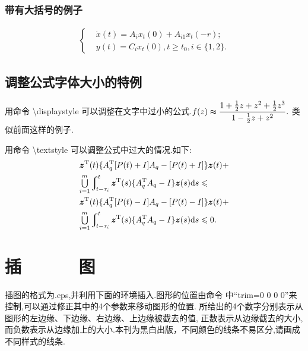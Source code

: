 \documentclass{ctacn}%
\begin{document}
\begin{multicols}{2}
\subsubsection{带有大括号的例子}\vspace{-15pt}
\begin{align}
\left\{\begin{aligned}
&\dot{x}(t)=A_{i}x_{t}(0)+A_{i1}x_{t}(-r);\\
&y(t)=C_{i}x_{t}(0),t\geqslant t_{0}, i\in\{1, 2\}.
\end{aligned}\right.
\end{align}


\subsection{调整公式字体大小的特例}

用命令 \textbackslash displaystyle  可以调整在文字中过小的公式.\;$f(z)\thickapprox{\displaystyle\frac{1+\frac{1}{2}z+z^2+\frac{1}{2}z^3}{1-\frac{1}{2}z+z^2}}.$
类似前面这样的例子.

用命令 \textbackslash textstyle 可以调整公式中过大的情况.\;如下:
\begin{align}
&{\bm z}^{\rm T}(t)\{A_q^{\rm T}[P(t)+I]A_q-[P(t)+I]\}{\bm z}(t)+ \notag\\
&{\textstyle\bigcup\limits_{i=1}^m}\varint\nolimits_{t-\tau_i}^t{\bm
	z}^{\rm T}(s)\{A_q^{\rm T}A_q-I\}{\bm z}(s){\rm d}s\leqslant \notag\\
&{\bm z}^{\rm T}(t)\{A_q^{\rm T}[P(t)-I]A_q-[P(t)-I]\}{\bm z}(t)+ \notag\\
&{\textstyle\bigcup\limits_{i=1}^m}\varint\nolimits_{t-\tau_i}^t{\bm
	z}^{\rm T}(s)\{A_q^{\rm T}A_q-I\}{\bm z}(s){\rm d}s\leqslant 0.
\end{align}

\section{插~~~~~~图}

插图的格式为.eps,并利用下面的环境插入.图形的位置由命令
中“trim=0 0 0 0”来控制,可以通过修正其中的4个参数来移动图形的位置.
所给出的4个数字分别表示从图形的左边缘、下边缘、右边缘、上边缘被截去的值,
正数表示从边缘截去的大小, 而负数表示从边缘加上的大小.\;本刊为黑白出版，不同颜色的线条不易区分,请画成不同样式的线条.


\end{multicols}
\end{document}
